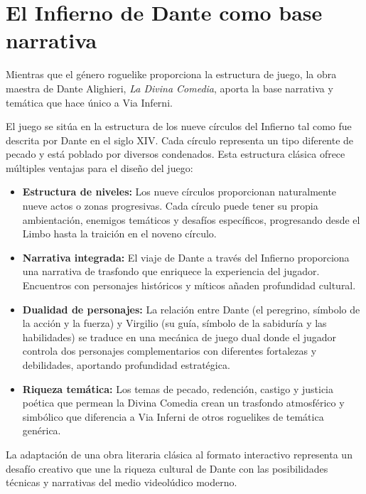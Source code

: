 \section{El Infierno de Dante como base narrativa}

Mientras que el género roguelike proporciona la estructura de juego,
la obra maestra de Dante Alighieri, \textit{La Divina Comedia},
aporta la base narrativa y temática que hace único a Via Inferni.

El juego se sitúa en la estructura de los nueve círculos del Infierno
tal como fue descrita por Dante en el siglo XIV.
Cada círculo representa un tipo diferente de pecado
y está poblado por diversos condenados.
Esta estructura clásica ofrece múltiples ventajas para el diseño del juego:

\begin{itemize}
    \item \textbf{Estructura de niveles:} Los nueve círculos proporcionan naturalmente
nueve actos o zonas progresivas.
Cada círculo puede tener su propia ambientación, enemigos temáticos y desafíos específicos,
progresando desde el Limbo hasta la traición en el noveno círculo.
    
    \item \textbf{Narrativa integrada:} El viaje de Dante a través del Infierno
proporciona una narrativa de trasfondo que enriquece la experiencia del jugador.
Encuentros con personajes históricos y míticos añaden profundidad cultural.
    
    \item \textbf{Dualidad de personajes:} La relación entre Dante
(el peregrino, símbolo de la acción y la fuerza)
y Virgilio (su guía, símbolo de la sabiduría y las habilidades)
se traduce en una mecánica de juego dual donde el jugador controla
dos personajes complementarios con diferentes fortalezas y debilidades,
aportando profundidad estratégica.
    
    \item \textbf{Riqueza temática:} Los temas de pecado, redención, castigo y justicia poética
que permean la Divina Comedia
crean un trasfondo atmosférico y simbólico
que diferencia a Via Inferni de otros roguelikes de temática genérica.
\end{itemize}

La adaptación de una obra literaria clásica al formato interactivo
representa un desafío creativo que une la riqueza cultural de Dante
con las posibilidades técnicas y narrativas del medio videolúdico moderno.

